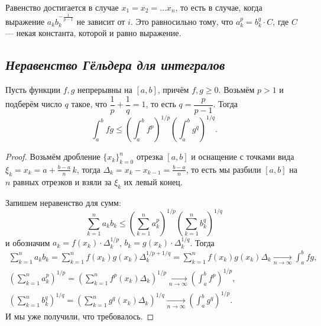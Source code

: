 \begin{remark}
	Равенство достигается в случае \(x_1 = x_2 = \ldots x_n\), то есть в случае, когда выражение \(a_k b_k^{-\frac{1}{p - 1}}\) не зависит от \(i\). Это равносильно тому, что \(a_k^p = b_k^q \cdot C\), где \(C\) --- некая константа, которой и равно выражение. 
\end{remark}

\subsection{\itshape Неравенство Гёльдера для интегралов}

\begin{theorem}
	Пусть функции \(f, g\) непрерывны на  \([a, b]\), причём \(f, g \geqslant 0\). Возьмём \(p > 1\) и подберём число \(q\) такое, что \(\dfrac{1}{p} + \dfrac{1}{q} = 1\), то есть \(q = \dfrac{p}{p - 1}\). Тогда \[
		\int_a^b fg \leqslant \left(\int_{a}^{b} f^p \right)^{1/p} \left(\int_{a}^{b} g^q \right)^{1/q}.
	\]
\end{theorem}
\begin{proof}
	Возьмём дробление \(\{x_k\}_{k=0}^n\) отрезка  \([a, b]\) и оснащение с точками вида \(\xi_k = x_k = a + \frac{b - a}{n} \, k\), тогда \(\Delta_k = x_{k} - x_{k-1} = \frac{b - a}{n}\), то есть мы разбили \([a, b]\) на \(n\) равных отрезков и взяли за \(\xi_k\) их левый конец.
	
	Запишем неравенство для сумм:
	\begin{equation} \label{ГёльГёль}
		\sum_{k=1}^n a_k b_k \leqslant \left(\sum_{k=1}^{n} a_k^p \right)^{1/p} \left(\sum_{k=1}^{n} b_k^q \right)^{1/q}
	\end{equation}
	и обозначим \(a_k = f(x_k) \cdot \Delta_k^{1/p}\), \(b_k = g(x_k) \cdot \Delta_k^{1/q}\). Тогда
	\begin{gather*}
		\sum_{k=1}^n a_k b_k = \sum_{k=1}^n f(x_k) g(x_k) \Delta_k^{1/p + 1/q} = \sum_{k=1}^n f(x_k) g(x_k) \Delta_k \xrightarrow[n \to \infty]{} \int_a^b fg, \\
		\left(\sum_{k=1}^n a_k^p \right)^{1/p} = \left(\sum_{k=1}^n f^p(x_k) \Delta_k \right)^{1/p} \xrightarrow[n \to \infty]{} \left(\int_a^b f^p \right)^{1/p}, \\
		\left(\sum_{k=1}^n b_k^q \right)^{1/q} = \left(\sum_{k=1}^n g^q(x_k) \Delta_k \right)^{1/q} \xrightarrow[n \to \infty]{} \left(\int_a^b g^q\right)^{1/p}.
	\end{gather*}
	И мы уже получили, что требовалось.
\end{proof}

